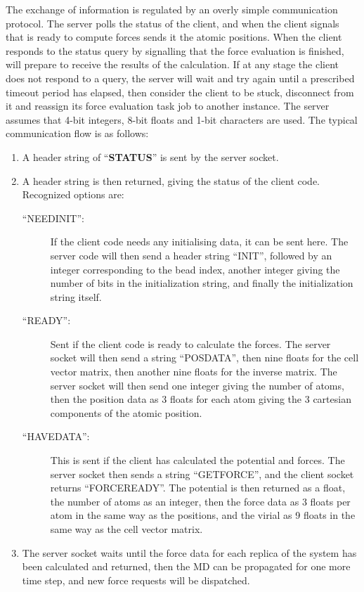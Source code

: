 \documentclass[11pt,english,fleqn]{report}
\begin{document}
The exchange of information is regulated by an overly simple 
communication protocol. The server polls the status of the client,
and when the client signals that is ready to compute forces 
sends it the atomic positions. When the client responds to the
status query by signalling that the force evaluation is finished,
\ipi will prepare to receive the results of the calculation.
 If at any stage the client does not respond to a query, the server 
will wait and try again until a prescribed timeout period has elapsed, 
then consider the client to be stuck, disconnect from it 
and reassign its force evaluation task job to another instance. 
The server assumes that 4-bit integers, 8-bit floats
and 1-bit characters are used. The typical communication flow is
as follows:
%
\begin{enumerate}
\item A header string of {}``\textbf{STATUS}'' is sent by the server socket.
\item A header string is then returned, giving the status of the client
code. Recognized options are:
\begin{description}
\item [{{}``NEEDINIT'':}] If the client code needs any initialising data,
it can be sent here. The server code will then send a header string
{}``INIT'', followed by an integer corresponding to the bead index,
another integer giving the number of bits in
the initialization string, and finally the initialization string itself.
\item [{{}``READY'':}] Sent if the client code is ready to calculate
the forces. The server socket will then send a string {}``POSDATA'',
then nine floats for the cell vector matrix, then another nine floats
for the inverse matrix. The server socket will then send one
integer giving the number of atoms, then the position data as 3 floats
for each atom giving the 3 cartesian components of the atomic position.
\item [{{}``HAVEDATA'':}] This is sent if the client has calculated the
potential and forces. The server socket then sends a string {}``GETFORCE'',
and the client socket returns {}``FORCEREADY''. The potential is
then returned as a float, the number of atoms as an integer, then
the force data as 3 floats per atom in the same way as the positions,
and the virial as 9 floats in the same way as the cell vector matrix.
\end{description}
\item The server socket waits until the force data for each replica of the
system has been calculated and returned, then the MD can be propagated for
one more time step, and new force requests will be dispatched.
\end{enumerate}
\end{document}
